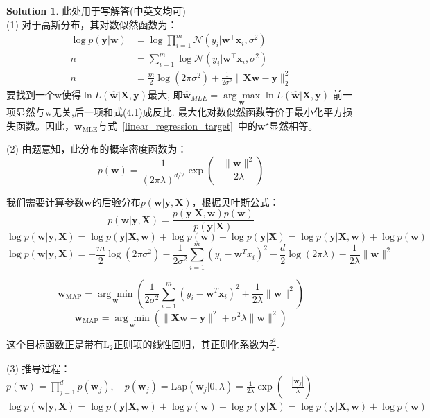 \documentclass[a4paper,UTF8]{article}
\numberwithin{equation}{section}
\theoremstyle{definition}
\newtheorem*{solution}{Solution}
\def \X {\mathbf{X}}
\def \w {\hat{\boldsymbol{w}}}
\def \y {\boldsymbol{y}}
\newcommand{\vct}[1]{\boldsymbol{#1}} %
\newcommand{\vw}{\vct{w}}
\newcommand{\vx}{\vct{x}}
\newcommand{\vy}{\vct{y}}
\newcommand{\mat}[1]{\boldsymbol{#1}} %
\newcommand{\mX}{\mat{X}}
\begin{document}
\begin{solution}
此处用于写解答(中英文均可)
~\\
(1) 对于高斯分布，其对数似然函数为：
$$\begin{aligned}
\log p(\vy|\vw) &= \log \prod_{i=1}^{m} \mathcal{N}(y_i|\vw^\top\vx_i,\sigma^2) \\n&= \sum_{i=1}^{m} \log \mathcal{N}(y_i|\vw^\top\vx_i,\sigma^2) \\n&= \frac{m}{2}\log(2\pi\sigma^2) + \frac{1}{2\sigma^2}\|\mX\vw-\vy\|_2^2
\end{aligned}$$
要找到一个w使得$\ln L(\w|\X,\y)$最大, 即$\w_{MLE} = \underset{\bm w}{\arg\max} \ln L(\w|\X,\y)$
前一项显然与w无关,后一项和式(4.1)成反比.
最大化对数似然函数等价于最小化平方损失函数。因此，$\vw_{\mathrm{MLE}}$与式~\eqref{linear_regression_target}~中的$\vw^\star$显然相等。

(2) 由题意知，此分布的概率密度函数为：
\[ p(\vw) = \frac{1}{(2\pi\lambda)^{d/2}} \exp \left( -\frac{\|\vw\|^2}{2\lambda} \right) \]

我们需要计算参数$\vw$的后验分布$p(\vw|\y,\X)$，根据贝叶斯公式：
\[ p(\vw|\y,\X) = \frac{p(\y|\X,\vw)p(\vw)}{p(\y|\X)} \]
\[ \log p(\vw|\y,\X) = \log p(\y|\X,\vw) + \log p(\vw) - \log p(\y|\X) = \log p(\y|\X,\vw) + \log p(\vw) \]
\[ \log p(\vw|\y,\X) = -\frac{m}{2} \log(2\pi\sigma^2) - \frac{1}{2\sigma^2} \sum_{i=1}^{m} (y_i - \vw^T x_i)^2 - \frac{d}{2} \log(2\pi\lambda) - \frac{1}{2\lambda} \|\vw\|^2 \]

\[ \vw_{\mathrm{MAP}} = \underset{\vw}{\arg\min} \left( \frac{1}{2\sigma^2} \sum_{i=1}^{m} (y_i - \vw^T \mathbf{x}_i)^2 + \frac{1}{2\lambda} \|\vw\|^2 \right) \]
\[ \vw_{\mathrm{MAP}} = \underset{\vw}{\arg\min} \left( \|\X\vw - \y\|^2 + \sigma^2 \lambda \|\vw\|^2 \right) \]

这个目标函数正是带有$\mathrm{L}_{2}$正则项的线性回归，其正则化系数为$\frac{\sigma^2}{\lambda}$.

(3) 推导过程：\\
$p(\vw)=\prod_{j=1}^{d} p(\vw_j), \quad p(\vw_j)=\text{Lap}(\vw_j|0,\lambda)=\frac{1}{2\lambda} \exp\left(-\frac{|\vw_j|}{\lambda}\right)$\\
$\log p(\vw|\y,\X) = \log p(\y|\X,\vw) + \log p(\vw) - \log p(\y|\X) = \log p(\y|\X,\vw) + \log p(\vw)$


\end{solution}
\end{document}
